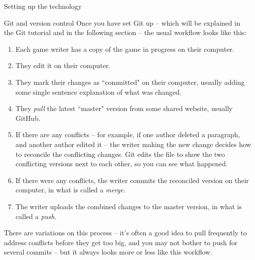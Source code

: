 \documentclass[sheet]{GameTexBase}
\begin{document}
\begin{section}{Setting up the technology}
\begin{subsection}{Git and version control}
Once you have set Git up -- which will be explained in the Git tutorial and in the following section -- the usual workflow looks like this:
\begin{enumerate}
\item Each game writer has a copy of the game in progress on their computer.
\item They edit it on their computer.
\item They mark their changes as ``committed" on their computer, usually adding some single sentence explanation of what was changed.
\item They \textit{pull} the latest ``master" version from some shared website, usually GitHub.  
\item If there are any conflicts – for example, if one author deleted a paragraph, and another author edited it – the writer making the new change decides how to reconcile the conflicting changes.  Git edits the file to show the two conflicting versions next to each other, so you can see what happened.
\item If there were any conflicts, the writer commits the reconciled version on their computer, in what is called a \textit{merge}.
\item The writer uploads the combined changes to the master version, in what is called a \textit{push}.
\end{enumerate}

There are variations on this process -- it's often a good idea to pull frequently to address conflicts before they get too big, and you may not bother to push for several commits -- but it always looks more or less like this workflow.


\end{subsection}
\end{section}
\end{document}
